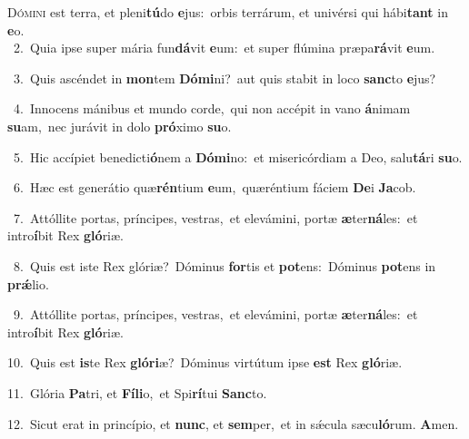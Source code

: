 \lettrine{\initial\textcolor{\initialcolor}{D}}{ómini} est terra, et pleni\-\textbf{tú}\-do \textbf{e}\-jus:~\star orbis terrárum, et univérsi qui hábi\textbf{tant} in \textbf{e}\-o.\\
{\numbfont\textcolor{\numbcolor}{~2.}}~Quia ipse super mária fun\-\textbf{dá}\-vit \textbf{e}\-um:~\star et super flúmina præpa\-\textbf{rá}\-vit \textbf{e}\-um.\par
{\numbfont\textcolor{\numbcolor}{~3.}}~Quis ascéndet in \textbf{mon}\-tem \textbf{Dó}\-\textbf{mi}ni?~\star aut quis stabit in loco \textbf{sanc}\-to \textbf{e}\-jus?\par
{\numbfont\textcolor{\numbcolor}{~4.}}~Innocens mánibus et mundo corde,~\dagger qui non accépit in vano \textbf{á}\-nimam \textbf{su}\-am,~\star nec jurávit in dolo \textbf{pró}\-ximo \textbf{su}\-o.\par
{\numbfont\textcolor{\numbcolor}{~5.}}~Hic accípiet benedicti\-\textbf{ó}\-nem a \textbf{Dó}\-\textbf{mi}no:~\star et misericórdiam a Deo, salu\-\textbf{tá}\-ri \textbf{su}\-o.\par
{\numbfont\textcolor{\numbcolor}{~6.}}~Hæc est generátio quæ\-\textbf{rén}\-tium \textbf{e}\-um,~\star quæréntium fáciem \textbf{De}\-i \textbf{Ja}\-cob.\par
{\numbfont\textcolor{\numbcolor}{~7.}}~Attóllite portas, príncipes, vestras,~\dagger et elevámini, portæ \textbf{æ}\-ter\-\textbf{ná}\-les:~\star et intro\-\textbf{í}\-bit Rex \textbf{gló}\-riæ.\par
{\numbfont\textcolor{\numbcolor}{~8.}}~Quis est iste Rex glóriæ?~\dagger Dóminus \textbf{for}\-tis et \textbf{pot}\-ens:~\star Dóminus \textbf{pot}\-ens in \textbf{prǽ}\-lio.\par
{\numbfont\textcolor{\numbcolor}{~9.}}~Attóllite portas, príncipes, vestras,~\dagger et elevámini, portæ \textbf{æ}\-ter\-\textbf{ná}\-les:~\star et intro\-\textbf{í}\-bit Rex \textbf{gló}\-riæ.\par
{\numbfont\textcolor{\numbcolor}{10.}}~Quis est \textbf{is}\-te Rex \textbf{gló}\-\textbf{ri}æ?~\star Dóminus virtútum ipse \textbf{est} Rex \textbf{gló}\-riæ.\par
{\numbfont\textcolor{\numbcolor}{11.}}~Glória \textbf{Pa}\-tri, et \textbf{Fí}\-\textbf{li}o,~\star et Spi\-\textbf{rí}\-tui \textbf{Sanc}\-to.\par
{\numbfont\textcolor{\numbcolor}{12.}}~Sicut erat in princípio, et \textbf{nunc}\-, et \textbf{sem}\-per,~\star et in sǽcula sæcu\-\textbf{ló}\-rum. \textbf{A}\-men.\par
